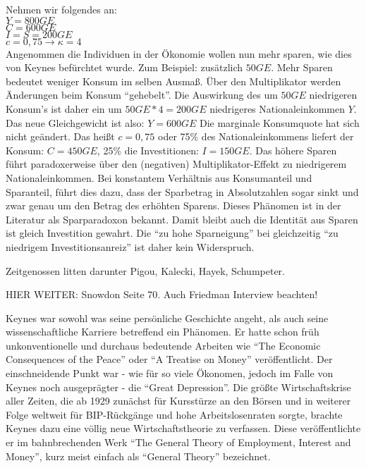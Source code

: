 Nehmen wir folgendes an:\\
$Y = 800GE$\\
$C = 600GE$\\
$I = S = 200GE$\\
$c = 0,75 \rightarrow \kappa = 4$\\

Angenommen die Individuen in der Ökonomie wollen nun mehr sparen, wie dies von Keynes befürchtet wurde. Zum Beispiel: zusätzlich $50GE$. Mehr Sparen bedeutet weniger Konsum im selben Ausmaß. Über den Multiplikator werden Änderungen beim Konsum "`gehebelt"'. Die Auswirkung des um $50GE$ niedrigeren Konsum's ist daher ein um $50GE * 4 = 200GE$ niedrigeres Nationaleinkommen $Y$. Das neue Gleichgewicht ist also: $Y = 600GE$ Die marginale Konsumquote hat sich nicht geändert. Das heißt $c = 0,75$ oder 75\% des Nationaleinkommens liefert der Konsum: $C = 450GE$, 25\% die Investitionen: $I = 150GE$. Das höhere Sparen führt paradoxerweise über den (negativen) Multiplikator-Effekt zu niedrigerem Nationaleinkommen. Bei konstantem Verhältnis aus Konsumanteil und Sparanteil, führt dies dazu, dass der Sparbetrag in Absolutzahlen sogar sinkt und zwar genau um den Betrag des erhöhten Sparens. Dieses Phänomen ist in der Literatur als Sparparadoxon bekannt. Damit bleibt auch die Identität aus Sparen ist gleich Investition gewahrt. Die "`zu hohe Sparneigung"' bei gleichzeitig "`zu niedrigem Investitionsanreiz"' ist daher kein Widerspruch. 

Zeitgenossen litten darunter Pigou, Kalecki, Hayek, Schumpeter. 

HIER WEITER: Snowdon Seite 70.
Auch Friedman Interview beachten!






Keynes war sowohl was seine persönliche Geschichte angeht, als auch seine wissenschaftliche Karriere betreffend ein Phänomen. Er hatte schon früh unkonventionelle und durchaus bedeutende Arbeiten wie \textcite{Keynes1919} "`The Economic Consequences of the Peace"' oder \textcite{Keynes1930} "`A Treatise on Money"' veröffentlicht. Der einschneidende Punkt war - wie für so viele Ökonomen, jedoch im Falle von Keynes noch ausgeprägter - die "`Great Depression"'. Die größte Wirtschaftskrise aller Zeiten,  die ab 1929 zunächst für Kursstürze an den Börsen und in weiterer Folge weltweit für BIP-Rückgänge und hohe Arbeitslosenraten sorgte, brachte Keynes dazu eine völlig neue Wirtschaftstheorie zu verfassen. Diese veröffentlichte er im bahnbrechenden Werk \textcite{Keynes1936} "`The General Theory of Employment, Interest and Money"', kurz meist einfach als "`General Theory"' bezeichnet. 


